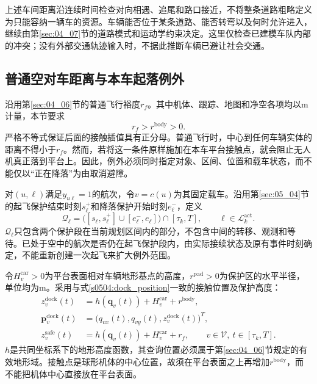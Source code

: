 上述车间距离沿连续时间检查对向相遇、追尾和路口接近，不将整条道路粗略定义为只能容纳一辆车的资源。车辆能否位于某条道路、能否转弯以及何时允许进入，继续由第\ref{sec:04_07}节的道路模式和运动学约束决定。这里仅检查已建模车队内部的冲突；没有外部交通轨迹输入时，不据此推断车辆已避让社会交通。

\subsection{普通空对车距离与本车起落例外}

沿用第\ref{sec:04_06}节的普通飞行裕度$r_f$。其中机体、跟踪、地图和净空各项均以$\mathrm m$计量，本节要求
\begin{equation}
 r_f>r^{\mathrm{body}}>0.
 \label{s0506:contact_parameter_domain}
\end{equation}
严格不等式保证后面的接触插值具有正分母。普通飞行时，中心到任何车辆实体的距离不得小于$r_f$。然而，若将这一条件原样施加在本车平台接触点，就会阻止无人机真正落到平台上。因此，例外必须同时指定对象、区间、位置和载车状态，而不能仅以“正在降落”为由取消避障。

对$(u,\ell)$满足$y_{u\ell}=1$的航次，令$v=c(u)$为其固定载车。沿用第\ref{sec:05_04}节的起飞保护结束时刻$s_\ell^+$和降落保护开始时刻$e_\ell^-$，定义
\begin{equation}
 \mathcal Q_\ell=
 \bigl([s_\ell,s_\ell^+]\cup[e_\ell^-,e_\ell]\bigr)
 \cap[\tau_k,T],
 \qquad \ell\in\mathcal L_k^{\mathrm{act}}.
 \label{s0506:protected_times}
\end{equation}
$\mathcal Q_\ell$只包含两个保护段在当前规划区间内的部分，不包含中间的转移、观测和等待。已处于空中的航次是否仍在起飞保护段内，由实际接续状态及原有事件时刻确定，不能重新创建一次起飞来扩大例外范围。

令$H_v^{\mathrm{car}}>0$为平台表面相对车辆地形基点的高度，$r^{\mathrm{pad}}>0$为保护区的水平半径，单位均为$\mathrm m$。采用与式\eqref{s0504:dock_position}一致的接触位置及保护高度：
\begin{align}
 z_v^{\mathrm{dock}}(t)
 &=h(\mathbf q_v(t))+H_v^{\mathrm{car}}+r^{\mathrm{body}},
 \label{s0506:dock_height}\\
 \mathbf p_v^{\mathrm{dock}}(t)
 &=\bigl(q_{vx}(t),q_{vy}(t),z_v^{\mathrm{dock}}(t)\bigr)^T,
 \label{s0506:dock_point}\\
 z_v^{\mathrm{safe}}(t)
 &=h(\mathbf q_v(t))+H_v^{\mathrm{car}}+r_f,
 \qquad v\in\mathcal V,\ t\in[\tau_k,T].
 \label{s0506:safe_height}
\end{align}
$h$是共同坐标系下的地形高度函数，其查询位置必须属于第\ref{sec:04_06}节规定的有效地形域。接触点是球形机体的中心位置，故须在平台表面之上再增加$r^{\mathrm{body}}$，而不能把机体中心直接放在平台表面。

